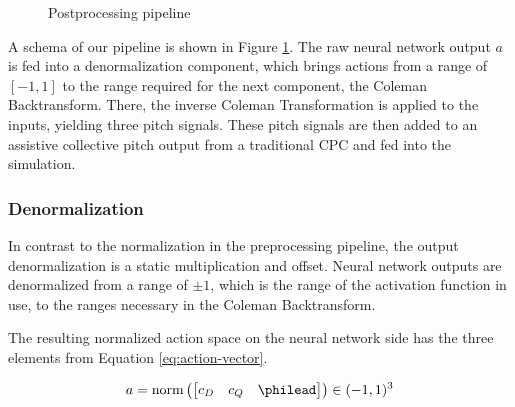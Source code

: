 \begin{figure}
  \centering

  \caption{Postprocessing pipeline}
  \label{fig:postprocessing-pipeline}
\end{figure}

A schema of our pipeline is shown in Figure \ref{fig:postprocessing-pipeline}. The raw neural network output $a$ is fed into a denormalization component, which brings actions from a range of $[-1, 1]$ to the range required for the next component, the Coleman Backtransform. There, the inverse Coleman Transformation is applied to the inputs, yielding three pitch signals. These pitch signals are then added to an assistive collective pitch output from a traditional CPC and fed into the simulation.

\subsubsection{Denormalization}

In contrast to the normalization in the preprocessing pipeline, the output denormalization is a static multiplication and offset. Neural network outputs are denormalized from a range of $\pm1$, which is the range of the activation function in use, to the ranges necessary in the Coleman Backtransform. 

The resulting normalized action space on the neural network side has the three elements from Equation \ref{eq:action-vector}.

\begin{equation}
  a = \text{norm} \left(
  \begin{bmatrix}
    c_D & c_Q & \philead
  \end{bmatrix} 
  \right) \in (-1, 1)^3
  \label{eq:action-vector}
\end{equation}


